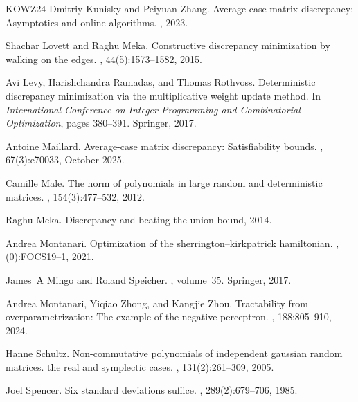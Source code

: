 \documentclass[11pt]{article}
\theoremstyle{definition}
\theoremstyle{remark}
\numberwithin{equation}{section}
\numberwithin{theorem}{section}
\begin{document}
\begin{thebibliography}{KOWZ24}
Dmitriy Kunisky and Peiyuan Zhang.
\newblock Average-case matrix discrepancy: Asymptotics and online algorithms.
, 2023.

Shachar Lovett and Raghu Meka.
\newblock Constructive discrepancy minimization by walking on the edges.
, 44(5):1573--1582, 2015.

Avi Levy, Harishchandra Ramadas, and Thomas Rothvoss.
\newblock Deterministic discrepancy minimization via the multiplicative weight update method.
\newblock In {\em International Conference on Integer Programming and Combinatorial Optimization}, pages 380--391. Springer, 2017.

Antoine Maillard.
\newblock Average-case matrix discrepancy: Satisfiability bounds.
, 67(3):e70033, October 2025.

Camille Male.
\newblock The norm of polynomials in large random and deterministic matrices.
, 154(3):477--532, 2012.

Raghu Meka.
\newblock Discrepancy and beating the union bound, 2014.

Andrea Montanari.
\newblock Optimization of the sherrington--kirkpatrick hamiltonian.
, (0):FOCS19--1, 2021.

James~A Mingo and Roland Speicher.
, volume~35.
\newblock Springer, 2017.

Andrea Montanari, Yiqiao Zhong, and Kangjie Zhou.
\newblock Tractability from overparametrization: The example of the negative perceptron.
, 188:805--910, 2024.

Hanne Schultz.
\newblock Non-commutative polynomials of independent gaussian random matrices. the real and symplectic cases.
, 131(2):261--309, 2005.

Joel Spencer.
\newblock Six standard deviations suffice.
, 289(2):679--706, 1985.


\end{thebibliography}
\end{document}
